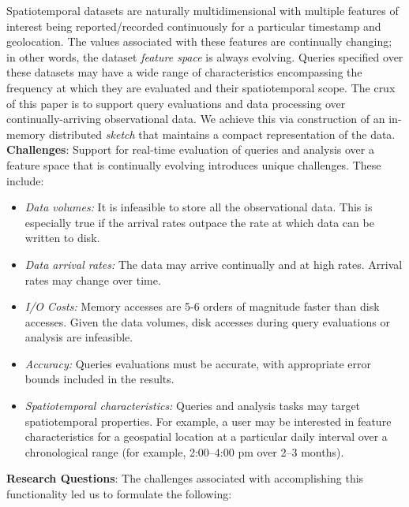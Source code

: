 Spatiotemporal datasets are naturally multidimensional with multiple features of interest being reported/recorded continuously for a particular timestamp and geolocation. The values associated with these features are continually changing; in other words, the dataset \emph{feature space} is always evolving.  Queries specified over these datasets may have a wide range of characteristics encompassing the frequency at which they are evaluated and their spatiotemporal scope. The crux of this paper is to support query evaluations and data processing over continually-arriving observational data. We achieve this via construction of an in-memory distributed \emph{sketch} that maintains a compact representation of the data.
%
\vspace{0.7em}\\
%
\textbf{Challenges}:
Support for real-time evaluation of queries and analysis over a feature space that is continually evolving introduces unique challenges. These include:
\begin{itemize}[leftmargin=*]
    \item   \emph{Data volumes:} It is infeasible to store all the observational data. This is especially true if the arrival rates outpace the rate at which data can be written to disk.
    \item   \emph{Data arrival rates:} The data may arrive continually and at high rates. Arrival rates may change over time.
    \item \emph{I/O Costs:} Memory accesses are 5-6 orders of magnitude faster than disk accesses. Given the data volumes, disk accesses during query evaluations or analysis are infeasible.
    \item   \emph{Accuracy:} Queries evaluations must be accurate, with appropriate error bounds included in the results.
    \item   \emph{Spatiotemporal characteristics:} Queries and analysis tasks may target spatiotemporal properties. For example, a user may be interested in feature characteristics for a geospatial location at a particular daily interval over a chronological range (for example, 2:00--4:00 pm over 2--3 months).
\end{itemize}
%
\vspace{0.7em}
%
\textbf{Research Questions}:
The challenges associated with accomplishing this functionality led us to formulate the following:
